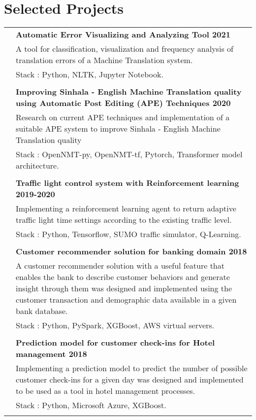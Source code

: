 \documentclass[a4paper,11pt]{article}
\begin{document}
\section{Selected Projects}
\begin{adjustbox}{max width=\textwidth}
\begin{tabular}{r|p{19cm}}
 \emph{} & \normalsize \bf Automatic Error Visualizing and Analyzing Tool 2021 \textsc{}  \\\textsc{}&\small{A tool for classification, visualization and frequency analysis of translation errors of a Machine Translation system.}\\&\footnotesize{Stack : Python, NLTK, Jupyter Notebook.}\\\multicolumn{2}{c}{} \\
 \emph{} & \normalsize \bf Improving Sinhala - English Machine Translation quality using Automatic Post Editing (APE) Techniques 2020\textsc{}  \\\textsc{}&\small{Research  on current APE techniques and implementation of a suitable APE system to improve Sinhala - English Machine Translation quality}\\&\footnotesize{Stack : OpenNMT-py, OpenNMT-tf, Pytorch, Transformer model architecture.}\\\multicolumn{2}{c}{} \\
 
 \emph{} & \normalsize \bf Traffic light control system with Reinforcement learning   2019-2020 \textsc{}  \\\textsc{}&\small{Implementing a reinforcement learning agent to return adaptive traffic light time settings according to the existing traffic level.}\\&\footnotesize{Stack : Python, Tensorflow, SUMO traffic simulator, Q-Learning.}\\\multicolumn{2}{c}{} \\

 \textsc{} & \normalsize \bf Customer recommender solution for banking domain 2018 \\&\small {A customer recommender solution with a useful feature that enables the bank to describe customer behaviors and generate insight through them was designed and implemented using the customer transaction and demographic data available in a given bank database. }\\&\footnotesize{Stack : Python, PySpark, XGBoost, AWS virtual servers.}\\\multicolumn{2}{c}{} \\
 
\textsc{} & \normalsize \bf Prediction model for customer check-ins for Hotel management 2018 \\&\small {Implementing a prediction model to predict the number of possible customer check-ins for a given day was designed and implemented to be used as a tool in hotel management processes.}\\&\footnotesize{Stack : Python, Microsoft Azure, XGBoost.}\\\multicolumn{2}{c}{} \\
  
\end{tabular}
\end{adjustbox}
\end{document}
